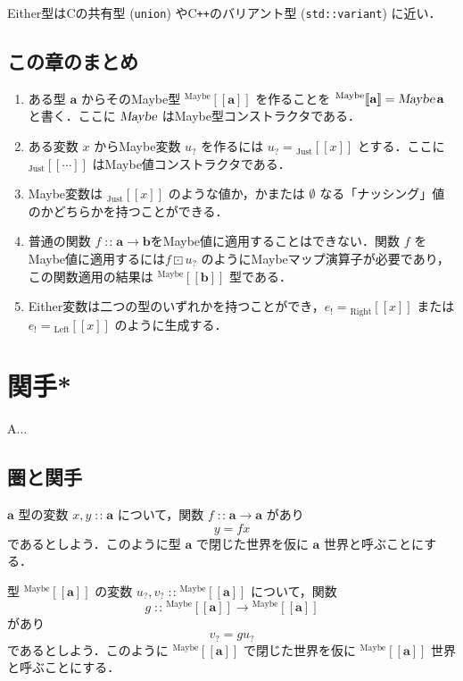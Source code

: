 \documentclass[a5paper,twoside,fleqn,draft]{jsbook}
\def\[{[\![}
\def\]{]\!]}
\newcommand{\programminglanguage}[1]{\textsf{#1}}
\newcommand{\clang}{\programminglanguage{C}}
\newcommand{\cxx}{\programminglanguage{C}\texttt{++}}
\newenvironment{leader}{\begingroup\gt}{\endgroup}
\newcommand{\code}[1]{\texttt{#1}}
\newcommand{\mNothing}{\emptyset}
\DeclareMathOperator{\mFuncArrow}{\rightarrow}
\DeclareMathOperator{\mIn}{{:\!:}}
\DeclareMathOperator{\mMapMaybe}{\boxdot}
\newcommand{\mType}[1]{\mathbf{#1}} %
\newcommand{\mA}{\mType{a}}
\newcommand{\mB}{\mType{b}}
\newcommand{\mTypeAssemble}[2]{{}^\mathrm{#1}\[\mType{#2}\]}
\newcommand{\mMaybeType}[1]{\mTypeAssemble{Maybe}{#1}}
\newcommand{\mTypeConstructor}[1]{\textsl{#1}}
\DeclareMathOperator{\mMaybeTypeConstructor}{\mTypeConstructor{Maybe}}
\newcommand{\mValueConstructor}[1]{\mathrm{#1}}
\newcommand{\mValueWith}[2]{{}_\mValueConstructor{#1}\[#2\]}
\newcommand{\mLeftWith}[1]{\mValueWith{Left}{#1}}
\newcommand{\mRightWith}[1]{\mValueWith{Right}{#1}}
\newcommand{\mJustWith}[1]{\mValueWith{Just}{#1}}
\newcommand{\mEither}[1]{{#1}_!}
\newcommand{\mMaybe}[1]{{#1}_?}
\newcommand{\mProjEXP}[2]{#1\mFuncArrow#2} %
\begin{document}
Either型は\clang の共有型 (\code{union}) や\cxx のバリアント型 (\code{std::variant}) に近い．

\section{この章のまとめ}

\begin{enumerate}
\item ある型 $\mA $ からそのMaybe型 $\mMaybeType{a}$ を作ることを $\mMaybeType{a}=\mMaybeTypeConstructor\mA $ と書く．ここに $\mMaybeTypeConstructor$ はMaybe型コンストラクタである．
\item ある変数 $x$ からMaybe変数 $\mMaybe{u}$ を作るには $\mMaybe{u}=\mJustWith{x}$ とする．ここに $\mJustWith{\dotsb}$ はMaybe値コンストラクタである．
\item Maybe変数は $\mJustWith{x}$ のような値か，かまたは $\mNothing$ なる「ナッシング」値のかどちらかを持つことができる．
\item 普通の関数 $f\mIn\mProjEXP{\mA }{\mB }$をMaybe値に適用することはできない．関数 $f$ をMaybe値に適用するには$f\mMapMaybe\mMaybe{u}$ のようにMaybeマップ演算子が必要であり，この関数適用の結果は $\mMaybeType{b}$ 型である．
\item Either変数は二つの型のいずれかを持つことができ，$\mEither{e}=\mRightWith{x}$ または$\mEither{e}=\mLeftWith{x}$ のように生成する．
\end{enumerate}

\chapter{関手*}
\label{ch:functor}

\begin{leader}
A...
\end{leader}

\section{圏と関手}

$\mA $ 型の変数 $x,y\mIn\mA$ について，関数 $f\mIn\mA\mFuncArrow\mA$ があり
\begin{equation}
  y
  =fx
\end{equation}
であるとしよう．このように型 $\mA$ で閉じた世界を仮に $\mA$ 世界と呼ぶことにする．

型 $\mMaybeType{a}$ の変数 $\mMaybe{u},\mMaybe{v}\mIn\mMaybeType{a}$ について，関数
\begin{equation}
  g
  \mIn\mMaybeType{a}\mFuncArrow\mMaybeType{a}
\end{equation}
があり
\begin{equation}
  \mMaybe{v}
  =g\mMaybe{u}
\end{equation}
であるとしよう．このように $\mMaybeType{a}$ で閉じた世界を仮に $\mMaybeType{a}$ 世界と呼ぶことにする．
\end{document}
